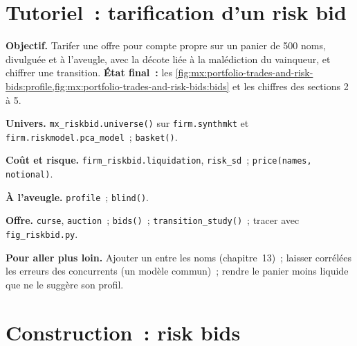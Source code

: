 \section{Tutoriel~: tarification d'un risk bid}\label{tut:mx:portfolio-trades-and-risk-bids:tut}

\begin{tutorial}
\textbf{Objectif.} Tarifer une offre pour compte propre sur un panier de 500 noms, divulguée et à l'aveugle, avec la décote liée à la malédiction du vainqueur, et chiffrer une transition.
\textbf{État final~:} les \cref{fig:mx:portfolio-trades-and-risk-bids:profile,fig:mx:portfolio-trades-and-risk-bids:bids} et les chiffres des sections 2 à 5.
\begin{tutsteps}
\item \textbf{Univers.} \texttt{mx\_riskbid.universe()} sur \texttt{firm.synthmkt} et \texttt{firm.riskmodel.pca\_model}~; \texttt{basket()}.
\item \textbf{Coût et risque.} \texttt{firm\_riskbid.liquidation}, \texttt{risk\_sd}~; \texttt{price(names, notional)}.
\item \textbf{À l'aveugle.} \texttt{profile}~; \texttt{blind()}.
\item \textbf{Offre.} \texttt{curse}, \texttt{auction}~; \texttt{bids()}~; \texttt{transition\_study()}~; tracer avec \texttt{fig\_riskbid.py}.
\end{tutsteps}
\textbf{Pour aller plus loin.} Ajouter un  entre les noms (chapitre~13)~; laisser corrélées les erreurs des concurrents (un modèle commun)~; rendre
le panier moins liquide que ne le suggère son profil.
\end{tutorial}

\section{Construction~: risk bids}\label{bld:mx:portfolio-trades-and-risk-bids:riskbid}

